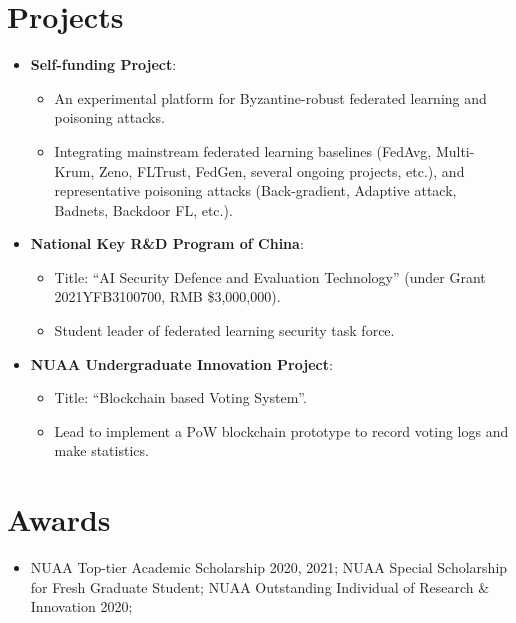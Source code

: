 \documentclass[letterpaper,11pt]{article}
\newcommand{\resumeItem}[2]{
  \item\small{
    \textbf{#1}{: #2 \vspace{-2pt}}
  }
}
\newcommand{\resumeSubItem}[2]{\resumeItem{#1}{#2}\vspace{-4pt}}
\newcommand{\resumeSubHeadingListStart}{\begin{itemize}[leftmargin=*]}
\newcommand{\resumeSubHeadingListEnd}{\end{itemize}}
\begin{document}
\section{Projects}
  \resumeSubHeadingListStart
    \resumeSubItem{Self-funding Project}\hfill{2020.01 -- , host, ongoing}
      {
        \begin{itemize}
          \item An experimental platform for Byzantine-robust federated learning and poisoning attacks.
          \item Integrating mainstream federated learning baselines (FedAvg, Multi-Krum, Zeno, FLTrust, FedGen, several ongoing projects, etc.), and representative poisoning attacks (Back-gradient, Adaptive attack, Badnets, Backdoor FL, etc.).
        \end{itemize}
      }
    \resumeSubItem{National Key R\&D Program of China}\hfill{2021.12 -- 2024.11, participant, ongoing}
      {
        \begin{itemize}
          \item Title: ``AI Security Defence and Evaluation Technology'' (under Grant 2021YFB3100700, RMB \$3,000,000).
          \item Student leader of federated learning security task force.
        \end{itemize}
      }
    \resumeSubItem{NUAA Undergraduate Innovation Project}\hfill{2017.12 -- 2018.05, principal participant, accomplished}
    {
        \begin{itemize}
          \item Title: ``Blockchain based Voting System''.
          \item Lead to implement a PoW blockchain prototype to record voting logs and make statistics.
        \end{itemize}
    }
  \resumeSubHeadingListEnd

%
\section{Awards}
  \resumeSubHeadingListStart
    \item{
      NUAA Top-tier Academic Scholarship 2020, 2021; NUAA Special Scholarship for Fresh Graduate Student; NUAA Outstanding Individual of Research \& Innovation 2020;
    }
  \resumeSubHeadingListEnd


\end{document}
